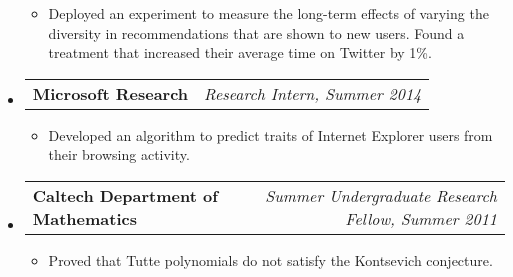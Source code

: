 \documentclass[letterpaper,10pt]{article}
\makeatletter
\newcommand{\resitem}[1]{\item #1 \vspace{-2pt}}
\newcommand{\resheading}[1]{{\large \colorbox{mygrey}{\begin{minipage}{\textwidth}{\textbf{#1 \vphantom{p\^{E}}}}\end{minipage}}}}
\newcommand{\ressubheading}[4]{
\begin{tabular*}{7.0in}{l@{\extracolsep{\fill}}r}
		\textbf{#1} & \textit{#4} \\
\end{tabular*}\vspace{-6pt}}
\makeatother
\begin{document}
\begin{itemize}
\begin{itemize}
\item Deployed an experiment to measure the long-term effects of varying the diversity in recommendations that are shown to new users.  Found a treatment that increased their average time on Twitter by 1\%.
	\end{itemize}
\item
	\ressubheading{Microsoft Research}{Mountain View, CA}{Intern}{Research Intern, Summer 2014}
	\begin{itemize}
		\resitem{Developed an algorithm to predict traits of Internet Explorer users from their browsing activity.}
	\end{itemize}
\item
	\ressubheading{Caltech Department of Mathematics}{Pasadena, CA}{Summer Undergraduate Research Fellow}{Summer Undergraduate Research Fellow, Summer 2011}
	\begin{itemize}
		\resitem{Proved that Tutte polynomials do not satisfy the Kontsevich conjecture.}
	\end{itemize}

\end{itemize}

%
%
\end{document}
